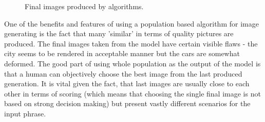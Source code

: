 \documentclass[12pt,a4paper,openany]{book}
\begin{document}
\begin{figure}[h]
    \centering
    \qquad
    \caption{Final images produced by algorithms.}%
    \label{fig:example}%
\end{figure}
\noindent One of the benefits and features of using a population based algorithm for image generating is the fact that many 'similar' in terms of quality pictures are produced. The final images taken from the model have certain visible flaws - the city seems to be rendered in acceptable manner but the cars are somewhat deformed. The good part of using whole population as the output of the model is that a human can objectively choose the best image from the last produced generation. It is vital given the fact, that last images are usually close to each other in terms of scoring (which means that choosing the single final image is not based on strong decision making) but present vastly different scenarios for the input phrase.\\
\end{document}

